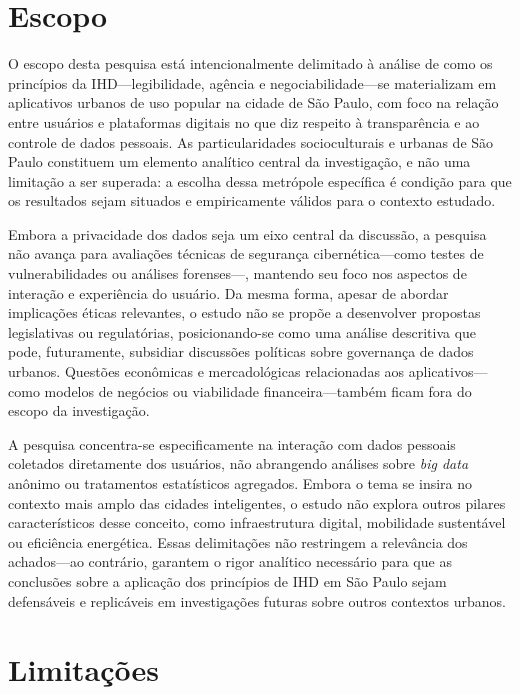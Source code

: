 \documentclass[
	12pt,				%
	oneside,			%
	a4paper,			%
	english,			%
	brazil				%
	]{abntex2ppgsi}
\begin{document}
 
 \section{Escopo}

    O escopo desta pesquisa está intencionalmente delimitado à análise de como os princípios da IHD---legibilidade, agência e negociabilidade---se materializam em aplicativos urbanos de uso popular na cidade de São Paulo, com foco na relação entre usuários e plataformas digitais no que diz respeito à transparência e ao controle de dados pessoais. As particularidades socioculturais e urbanas de São Paulo constituem um elemento analítico central da investigação, e não uma limitação a ser superada: a escolha dessa metrópole específica é condição para que os resultados sejam situados e empiricamente válidos para o contexto estudado.

    Embora a privacidade dos dados seja um eixo central da discussão, a pesquisa não avança para avaliações técnicas de segurança cibernética---como testes de vulnerabilidades ou análises forenses---, mantendo seu foco nos aspectos de interação e experiência do usuário. Da mesma forma, apesar de abordar implicações éticas relevantes, o estudo não se propõe a desenvolver propostas legislativas ou regulatórias, posicionando-se como uma análise descritiva que pode, futuramente, subsidiar discussões políticas sobre governança de dados urbanos. Questões econômicas e mercadológicas relacionadas aos aplicativos---como modelos de negócios ou viabilidade financeira---também ficam fora do escopo da investigação.

    A pesquisa concentra-se especificamente na interação com dados pessoais coletados diretamente dos usuários, não abrangendo análises sobre \textit{big data} anônimo ou tratamentos estatísticos agregados. Embora o tema se insira no contexto mais amplo das cidades inteligentes, o estudo não explora outros pilares característicos desse conceito, como infraestrutura digital, mobilidade sustentável ou eficiência energética. Essas delimitações não restringem a relevância dos achados---ao contrário, garantem o rigor analítico necessário para que as conclusões sobre a aplicação dos princípios de IHD em São Paulo sejam defensáveis e replicáveis em investigações futuras sobre outros contextos urbanos.


 \section{Limitações}\label{sec:limitacoes}
\end{document}

